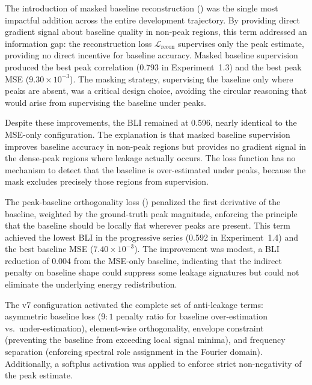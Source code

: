 The introduction of masked baseline reconstruction () was the single most impactful addition across the entire development trajectory. By providing direct gradient signal about baseline quality in non-peak regions, this term addressed an information gap: the reconstruction loss $\mathcal{L}_{\text{recon}}$ supervises only the peak estimate, providing no direct incentive for baseline accuracy. Masked baseline supervision produced the best peak correlation (0.793 in Experiment~1.3) and the best peak MSE ($9.30 \times 10^{-3}$). The masking strategy, supervising the baseline only where peaks are absent, was a critical design choice, avoiding the circular reasoning that would arise from supervising the baseline under peaks.

Despite these improvements, the BLI remained at 0.596, nearly identical to the MSE-only configuration. The explanation is that masked baseline supervision improves baseline accuracy in non-peak regions but provides no gradient signal in the dense-peak regions where leakage actually occurs. The loss function has no mechanism to detect that the baseline is over-estimated under peaks, because the mask excludes precisely those regions from supervision.

The peak-baseline orthogonality loss () penalized the first derivative of the baseline, weighted by the ground-truth peak magnitude, enforcing the principle that the baseline should be locally flat wherever peaks are present. This term achieved the lowest BLI in the progressive series (0.592 in Experiment~1.4) and the best baseline MSE ($7.40 \times 10^{-3}$). The improvement was modest, a BLI reduction of 0.004 from the MSE-only baseline, indicating that the indirect penalty on baseline shape could suppress some leakage signatures but could not eliminate the underlying energy redistribution.

The v7 configuration activated the complete set of anti-leakage terms: asymmetric baseline loss ($9{:}1$ penalty ratio for baseline over-estimation vs.\ under-estimation), element-wise orthogonality, envelope constraint (preventing the baseline from exceeding local signal minima), and frequency separation (enforcing spectral role assignment in the Fourier domain). Additionally, a softplus activation was applied to enforce strict non-negativity of the peak estimate.

